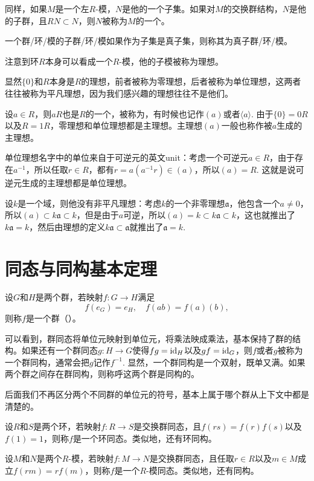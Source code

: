 同样，如果$M$是一个左$R$-模，$N$是他的一个子集。如果对$M$的交换群结构，$N$是他的子群，且$RN\subset N$，则$N$被称为$M$的一个。

一个群/环/模的子群/环/模如果作为子集是真子集，则称其为真子群/环/模。

\begin{para}
注意到环$R$本身可以看成一个$R$-模，他的子模被称为理想。
\end{para}

显然$\{0\}$和$R$本身是$R$的理想，前者被称为零理想，后者被称为单位理想，这两者往往被称为平凡理想，因为我们感兴趣的理想往往不是他们。

设$a\in R$，则$aR$也是$R$的一个，被称为，有时候也记作$(a)$或者$\langle a\rangle$. 由于$\{0\}=0R$以及$R=1R$，零理想和单位理想都是主理想。主理想$(a)$一般也称作被$a$生成的主理想。

单位理想名字中的单位来自于可逆元的英文unit：考虑一个可逆元$a\in R$，由于存在$a^{-1}$，所以任取$r\in R$，都有$r=a(a^{-1}r)\in (a)$，所以$(a)=R$. 这就是说可逆元生成的主理想都是单位理想。

设$k$是一个域，则他没有非平凡理想：考虑$k$的一个非零理想$\mathfrak{a}$，他包含一个$a\neq 0$，所以$(a)\subset k\mathfrak{a} \subset k$，但是由于$a$可逆，所以$(a)=k\subset k\mathfrak{a} \subset k$，这也就推出了$k\mathfrak{a}=k$，然后由理想的定义$k\mathfrak{a}\subset \mathfrak{a}$就推出了$\mathfrak{a}=k$.

\section{同态与同构基本定理}

\begin{para}
设$G$和$H$是两个群，若映射$f:G\to H$满足
\[
	f(e_G)=e_H,\quad f(ab)=f(a)(b),
\]
则称$f$是一个群（）。
\end{para}

可以看到，群同态将单位元映射到单位元，将乘法映成乘法，基本保持了群的结构。如果还有一个群同态$g:H\to G$使得$fg=\operatorname{id}_H$以及$gf=\operatorname{id}_G$，则$f$或者$g$被称为一个群同构，通常会把$g$记作$f^{-1}$. 显然，一个群同构是一个双射，既单又满。如果两个群之间存在群同构，则称呼这两个群是同构的。

后面我们不再区分两个不同群的单位元的符号，基本上属于哪个群从上下文中都是清楚的。

\para 设$R$和$S$是两个环，若映射$f:R\to S$是交换群同态，且$f(rs)=f(r)f(s)$以及$f(1)=1$，则称$f$是一个环同态。类似地，还有环同构。

设$M$和$N$是两个$R$-模，若映射$f:M\to N$是交换群同态，且任取$r\in R$以及$m\in M$成立$f(rm)=rf(m)$，则称$f$是一个$R$-模同态。类似地，还有同构。

